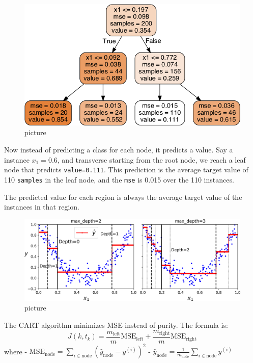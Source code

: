 \documentclass[
  letterpaper,
  DIV=11,
  numbers=noendperiod]{scrartcl}
\begin{document}
\begin{figure}[H]

{\centering \includegraphics{14.png}

}

\caption{picture}

\end{figure}%

Now instead of predicting a class for each node, it predicts a value.
Say a instance \(x_1=0.6\), and transverse starting from the root node,
we reach a leaf node that predicts \texttt{value=0.111}. This prediction
is the average target value of 110 \texttt{samples} in the leaf node,
and the \texttt{mse} is 0.015 over the 110 instances.

The predicted value for each region is always the average target value
of the instances in that region.

\begin{figure}[H]

{\centering \includegraphics{15.png}

}

\caption{picture}

\end{figure}%

The CART algorithm minimizes MSE instead of purity. The formula is: \[
J(k,t_k) = \frac{m_{\text{left}}}{m}\text{MSE}_{\text{left}} + \frac{m_{\text{right}}}{m}\text{MSE}_{\text{right}}
\] where -
\(\text{MSE}_{\text{node}} = \sum_{i \in \text{node}}(\hat{y}_{\text{node}} - y^{(i)})^2\)
-
\(\hat{y}_{\text{node}} = \frac{1}{m_{\text{node}}}\sum_{i \in \text{node}}y^{(i)}\)
\end{document}
